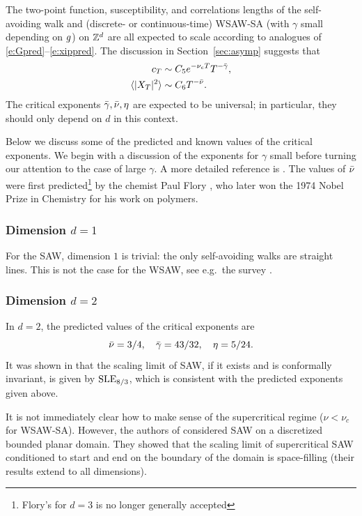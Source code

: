 The two-point function, susceptibility, and correlations lengths of the
self-avoiding walk and (discrete- or continuous-time) WSAW-SA (with $\gamma$ small
depending on $g$) on ${ {{\mathbb Z}}^d }$ are all expected
to scale according to analogues of \eqref{e:Gpred}--\eqref{e:xippred}.
The discussion in Section~\ref{sec:asymp} suggests that
\begin{align}
c_T                       &\sim C_5 e^{-\nu_c T} T^{-\bar\gamma}, \\
\langle |X_T|^2 \rangle   &\sim C_6 T^{-\bar\nu}.
\end{align}
The critical exponents $\bar\gamma, \bar\nu, \eta$ are expected to be universal;
in particular, they should only depend on $d$ in this context.

Below we discuss some of the predicted and known values of the critical exponents.
We begin with a discussion of the exponents for $\gamma$ small before turning our
attention to the case of large $\gamma$. A more detailed reference is \cite{MS93}.
The values
of $\bar\nu$ were first predicted\footnote{Flory's for $d = 3$ is no longer generally
accepted} by the chemist Paul Flory \cite{Flor49}, who
later won the 1974 Nobel Prize in Chemistry for his work on polymers.

\subsubsection{Dimension $d = 1$}

For the SAW, dimension $1$ is trivial: the only self-avoiding walks are straight
lines. This is not the case for the WSAW, see e.g.\ the survey \cite{HK01}.

\subsubsection{Dimension $d = 2$}

In $d = 2$, the predicted values of the critical exponents are
\begin{equation}
\bar\nu = 3/4, \quad \bar\gamma = 43/32, \quad \eta = 5/24.
\end{equation}
It was shown in \cite{LSW04} that the scaling limit of SAW, if it exists and
is conformally invariant, is given by ${\rm SLE}_{8/3}$, which is consistent with
the predicted exponents given above.

It is not immediately clear how to make sense of the supercritical regime
($\nu < \nu_c$ for WSAW-SA).
However, the authors of \cite{LSW04} considered SAW on a discretized bounded
planar domain. They showed that the scaling limit of supercritical
SAW conditioned to start and end on the boundary of the domain is space-filling
(their results extend to all dimensions).

